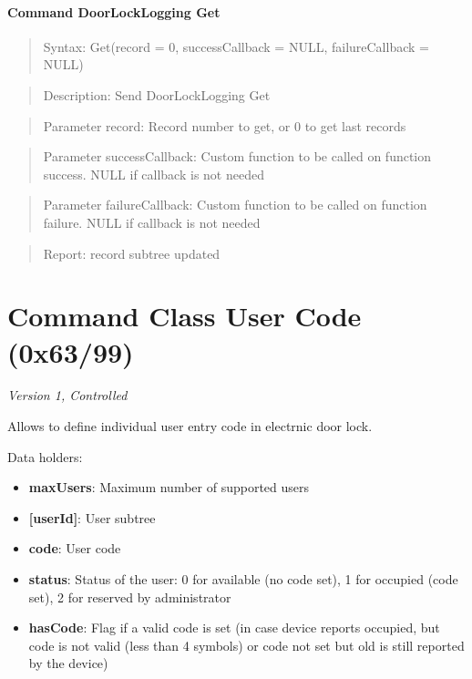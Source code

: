 \paragraph{Command DoorLockLogging Get}
\begin{quote}Syntax: Get(record = 0, successCallback = NULL, failureCallback = NULL)\end{quote}
\begin{quote}Description: Send DoorLockLogging Get\end{quote}
\begin{quote}Parameter record: Record number to get, or 0 to get last records\end{quote}
\begin{quote}Parameter successCallback: Custom function to be called on function success. NULL if callback is not needed\end{quote}
\begin{quote}Parameter failureCallback: Custom function to be called on function failure. NULL if callback is not needed\end{quote}
\begin{quote}Report: record subtree updated\end{quote}


\section{Command Class User Code (0x63/99)}

\textit{Version 1, Controlled}
\newline

Allows to define individual user entry code in electrnic door lock.
\newline

\noindent
Data holders:

\begin{itemize}
\item \textbf{maxUsers}: Maximum number of supported users
\item \textbf{[userId]}: User subtree
\item \qquad\textbf{code}: User code
\item \qquad\textbf{status}: Status of the user: 0 for available (no code set), 1 for occupied (code set), 2 for reserved by administrator
\item \qquad\textbf{hasCode}: Flag if a valid code is set (in case device reports occupied, but code is not valid (less than 4 symbols) or code not set but old is still reported by the device)
\end{itemize}

